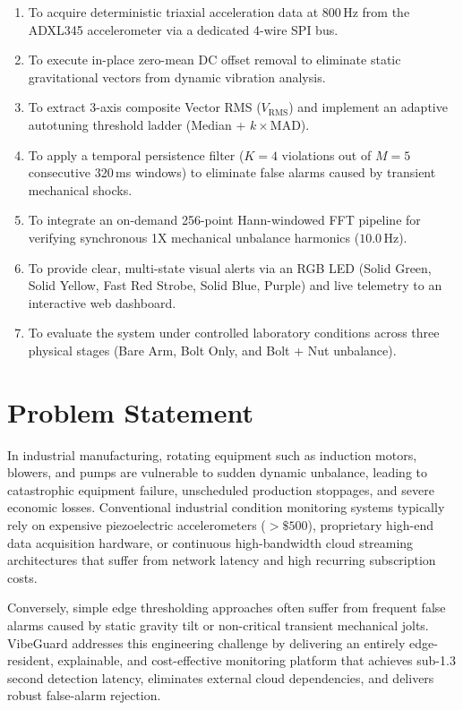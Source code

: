 \begin{enumerate}
    \item To acquire deterministic triaxial acceleration data at 800\,Hz from the ADXL345 accelerometer via a dedicated 4-wire SPI bus.
    \item To execute in-place zero-mean DC offset removal to eliminate static gravitational vectors from dynamic vibration analysis.
    \item To extract 3-axis composite Vector RMS ($V_{\mathrm{RMS}}$) and implement an adaptive autotuning threshold ladder (Median + $k \times \mathrm{MAD}$).
    \item To apply a temporal persistence filter ($K=4$ violations out of $M=5$ consecutive 320\,ms windows) to eliminate false alarms caused by transient mechanical shocks.
    \item To integrate an on-demand 256-point Hann-windowed FFT pipeline for verifying synchronous 1X mechanical unbalance harmonics ($10.0$\,Hz).
    \item To provide clear, multi-state visual alerts via an RGB LED (Solid Green, Solid Yellow, Fast Red Strobe, Solid Blue, Purple) and live telemetry to an interactive web dashboard.
    \item To evaluate the system under controlled laboratory conditions across three physical stages (Bare Arm, Bolt Only, and Bolt + Nut unbalance).
\end{enumerate}

\section{Problem Statement}
\hspace{2em}In industrial manufacturing, rotating equipment such as induction motors, blowers, and pumps are vulnerable to sudden dynamic unbalance, leading to catastrophic equipment failure, unscheduled production stoppages, and severe economic losses. Conventional industrial condition monitoring systems typically rely on expensive piezoelectric accelerometers ($>\$500$), proprietary high-end data acquisition hardware, or continuous high-bandwidth cloud streaming architectures that suffer from network latency and high recurring subscription costs. 

\hspace{2em}Conversely, simple edge thresholding approaches often suffer from frequent false alarms caused by static gravity tilt or non-critical transient mechanical jolts. VibeGuard addresses this engineering challenge by delivering an entirely edge-resident, explainable, and cost-effective monitoring platform that achieves sub-1.3\,second detection latency, eliminates external cloud dependencies, and delivers robust false-alarm rejection.

